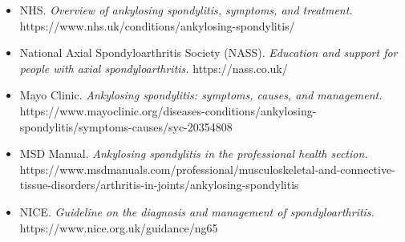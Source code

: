\begin{itemize}
    \item NHS. \textit{Overview of ankylosing spondylitis, symptoms, and treatment.} https://www.nhs.uk/conditions/ankylosing-spondylitis/
    \item National Axial Spondyloarthritis Society (NASS). \textit{Education and support for people with axial spondyloarthritis.} https://nass.co.uk/
    \item Mayo Clinic. \textit{Ankylosing spondylitis: symptoms, causes, and management.} https://www.mayoclinic.org/diseases-conditions/ankylosing-spondylitis/symptoms-causes/syc-20354808
    \item MSD Manual. \textit{Ankylosing spondylitis in the professional health section.} https://www.msdmanuals.com/professional/musculoskeletal-and-connective-tissue-disorders/arthritis-in-joints/ankylosing-spondylitis
    \item NICE. \textit{Guideline on the diagnosis and management of spondyloarthritis.} https://www.nice.org.uk/guidance/ng65
\end{itemize}
